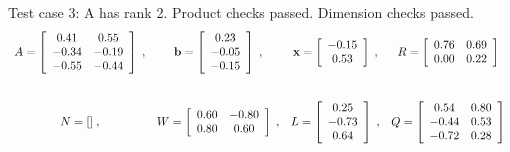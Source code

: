 {Test case 3: A has rank 2. Product checks passed. Dimension checks passed.
\[
\begin{array}{*{4}{c}}
A = \left[\begin{array}{*{2}c}
	0.41 & 0.55\\
	-0.34 & -0.19\\
	-0.55 & -0.44
\end{array}\right]
\;, & 
\mathbf{b} = \left[\begin{array}{*{1}c}
	0.23\\
	-0.05\\
	-0.15
\end{array}\right]
\;, & 
\mathbf{x} = \left[\begin{array}{*{1}c}
	-0.15\\
	0.53
\end{array}\right]
\;, & 
R = \left[\begin{array}{*{2}c}
	0.76 & 0.69\\
	0.00 & 0.22
\end{array}\right]
\\
\\\mbox{}\\
N = []\;, & 
W = \left[\begin{array}{*{2}c}
	0.60 & -0.80\\
	0.80 & 0.60
\end{array}\right]
\;, & 
L = \left[\begin{array}{*{1}c}
	0.25\\
	-0.73\\
	0.64
\end{array}\right]
\;, & 
Q = \left[\begin{array}{*{2}c}
	0.54 & 0.80\\
	-0.44 & 0.53\\
	-0.72 & 0.28
\end{array}\right]
\\
\end{array}
\]
\hrulefill

}
